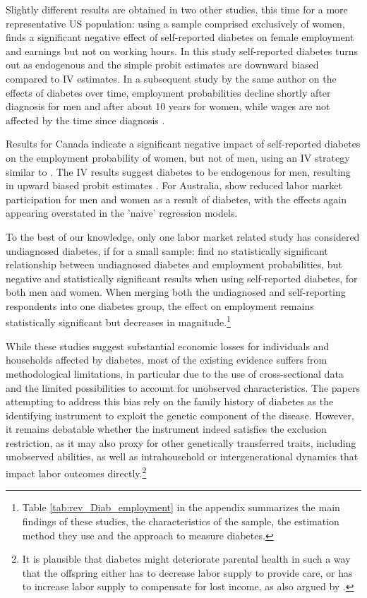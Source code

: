 \documentclass[12pt,english]{article}
\begin{document}
Slightly different results are obtained in two other studies, this time for a more representative US population: using a sample comprised exclusively of women, \textcite{Minor2011} finds a significant negative effect of self-reported diabetes on female employment and earnings but not on working hours. In this study self-reported diabetes turns out as endogenous and the simple probit estimates are downward biased compared to \ac{IV} estimates. In a subsequent study by the same author on the effects of diabetes over time, employment probabilities decline shortly after diagnosis for men and after about 10 years for women, while wages are not affected by the time since diagnosis \parencite{Minor2013}.

Results for Canada indicate a significant negative impact of self-reported diabetes on the employment probability of women, but not of men, using an \ac{IV} strategy similar to \textcite{Brown2005}. The \ac{IV} results suggest diabetes to be  endogenous for men, resulting in upward biased probit estimates \parencite{Latif2009}. For Australia, \textcite{Zhang2009} show  reduced labor market participation for men and women as a result of diabetes, with the effects again appearing overstated in the 'naive' regression models.

To the best of our knowledge, only one labor market related study has considered undiagnosed diabetes, if for a small sample: \textcite{Minor2015} find no statistically significant relationship between undiagnosed diabetes and employment probabilities, but negative and statistically significant results when using self-reported diabetes, for both men and women. When merging both the undiagnosed and self-reporting respondents into one diabetes group, the effect on employment remains statistically significant but decreases in magnitude.\footnote{Table \ref{tab:rev_Diab_employment} in the appendix summarizes the main findings of these studies, the characteristics of the sample, the estimation method they use and the approach to measure diabetes.}

While these studies suggest substantial economic losses for individuals and households affected by diabetes, most of the existing evidence suffers from methodological limitations, in particular due to the use of cross-sectional data and the limited possibilities to account for unobserved characteristics. The papers attempting to address this bias rely on the family history of diabetes as the identifying instrument to exploit the genetic component of the disease. However, it remains debatable whether the instrument indeed satisfies the exclusion restriction, as it may also proxy for other genetically transferred traits, including unobserved abilities, as well as  intrahousehold or intergenerational dynamics that impact labor outcomes directly.\footnote{It is plausible that diabetes might deteriorate parental health in such a way that the offspring either has to decrease labor supply to provide care, or has to increase labor supply to compensate for lost income, as also argued by \textcite{Seuring2015}.} 
\end{document}

